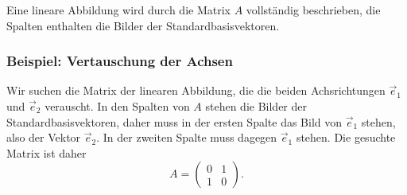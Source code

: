 \begin{satz}
\label{satz:affin:bilderderstandardbasisvektoren}
Eine lineare Abbildung wird durch die Matrix $A$ vollständig beschrieben,
die Spalten enthalten die Bilder der Standardbasisvektoren.
\end{satz}

\subsubsection{Beispiel: Vertauschung der Achsen}
Wir suchen die Matrix der linearen Abbildung, die die beiden Achsrichtungen
$\vec{e}_1$ und $\vec{e}_2$ verauscht.
In den Spalten von $A$ stehen die Bilder der Standardbasisvektoren,
daher muss in der ersten Spalte das Bild von $\vec{e}_1$ stehen, also
der Vektor $\vec{e}_2$.
In der zweiten Spalte muss dagegen $\vec{e}_1$ stehen.
Die gesuchte Matrix ist daher
\[
A=\begin{pmatrix}0&1\\1&0\end{pmatrix}.
\]

